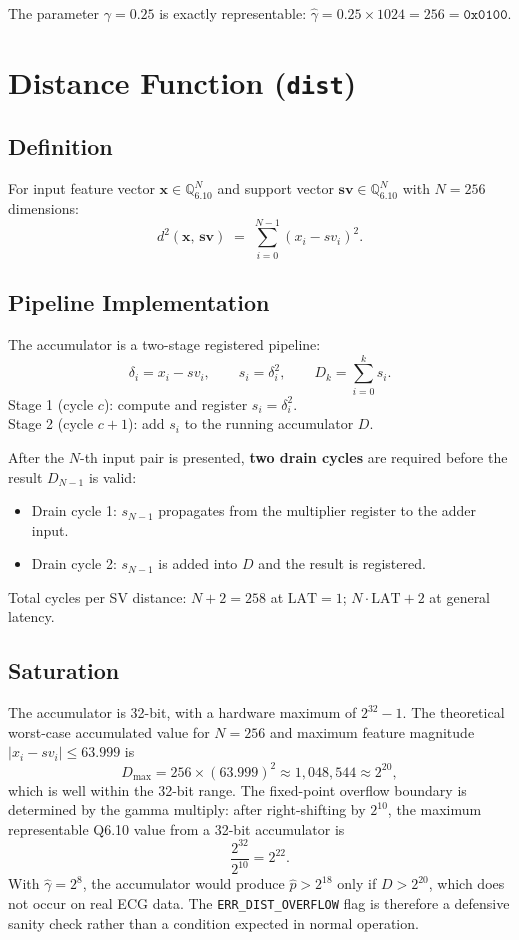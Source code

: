 \documentclass[11pt]{article}
\begin{document}
The parameter \(\gamma = 0.25\) is exactly representable:
\(\hat{\gamma} = 0.25 \times 1024 = 256 = \texttt{0x0100}\).

\section{Distance Function (\texttt{dist})}

\subsection{Definition}

For input feature vector \(\mathbf{x} \in \mathbb{Q}_{6.10}^{N}\) and support
vector \(\mathbf{sv} \in \mathbb{Q}_{6.10}^{N}\) with \(N = 256\) dimensions:
\[
    d^2(\mathbf{x},\, \mathbf{sv})
    \;=\;
    \sum_{i=0}^{N-1} \left( x_i - sv_i \right)^2.
\]

\subsection{Pipeline Implementation}

The accumulator is a two-stage registered pipeline:
\[
    \delta_i = x_i - sv_i,
    \qquad
    s_i = \delta_i^2,
    \qquad
    D_k = \sum_{i=0}^{k} s_i.
\]
Stage 1 (cycle \(c\)): compute and register \(s_i = \delta_i^2\).\\
Stage 2 (cycle \(c+1\)): add \(s_i\) to the running accumulator \(D\).

After the \(N\)-th input pair is presented, \textbf{two drain cycles} are
required before the result \(D_{N-1}\) is valid:
\begin{itemize}
    \item Drain cycle 1: \(s_{N-1}\) propagates from the multiplier register to
          the adder input.
    \item Drain cycle 2: \(s_{N-1}\) is added into \(D\) and the result is
          registered.
\end{itemize}
Total cycles per SV distance: \(N + 2 = 258\) at \(\text{LAT}=1\);
\quad \(N \cdot \text{LAT} + 2\) at general latency.

\subsection{Saturation}

The accumulator is 32-bit, with a hardware maximum of \(2^{32} - 1\).
The theoretical worst-case accumulated value for \(N=256\) and maximum
feature magnitude \(|x_i - sv_i| \leq 63.999\) is
\[
    D_{\max} = 256 \times (63.999)^2 \approx 1{,}048{,}544 \approx 2^{20},
\]
which is well within the 32-bit range. The fixed-point overflow boundary
is determined by the gamma multiply: after right-shifting by \(2^{10}\),
the maximum representable Q6.10 value from a 32-bit accumulator is
\[
    \frac{2^{32}}{2^{10}} = 2^{22}.
\]
With \(\hat{\gamma} = 2^8\), the accumulator would produce
\(\hat{p} > 2^{18}\) only if \(D > 2^{20}\), which does not occur on
real ECG data. The \texttt{ERR\_DIST\_OVERFLOW} flag is therefore a
defensive sanity check rather than a condition expected in normal
operation.
\end{document}
